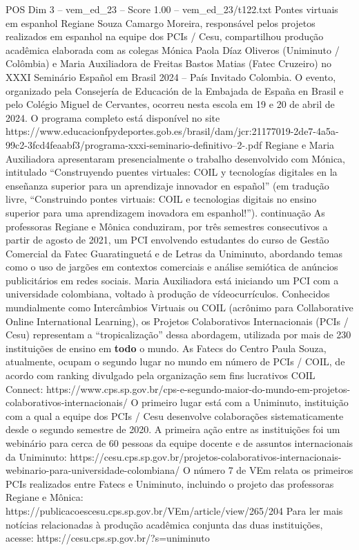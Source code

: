 \begin{textsample}{POS Dim 3 – vem\_ed\_23 – Score 1.00 – vem\_ed\_23/t122.txt}  \label{ex:f3_pos_038}
Pontes virtuais em espanhol Regiane Souza Camargo Moreira, responsável pelos projetos realizados em espanhol na equipe dos PCIs / Cesu, compartilhou produção acadêmica elaborada com as colegas Mónica Paola Díaz Oliveros (Uniminuto / Colômbia) e Maria Auxiliadora de Freitas Bastos Matias (Fatec Cruzeiro) no XXXI Seminário Español em Brasil 2024 – País Invitado Colombia.
O evento, organizado pela Consejería de Educación de la Embajada de España en Brasil e pelo Colégio Miguel de Cervantes, ocorreu nesta escola em 19 e 20 de abril de 2024.
O programa completo está disponível no site https://www.educacionfpydeportes.gob.es/brasil/dam/jcr:21177019-2de7-4a5a-99c2-3fcd4feaabf3/programa-xxxi-seminario-definitivo--2-.pdf Regiane e Maria Auxiliadora apresentaram presencialmente o trabalho desenvolvido com Mónica, intitulado “Construyendo puentes virtuales: COIL y tecnologías digitales en la enseñanza superior para un aprendizaje innovador en español” (em tradução livre, “Construindo pontes virtuais: COIL e tecnologias digitais no ensino superior para uma aprendizagem inovadora em espanhol!”). continuação As professoras Regiane e Mônica conduziram, por três semestres consecutivos a partir de agosto de 2021, um PCI envolvendo estudantes do curso de Gestão Comercial da Fatec Guaratinguetá e de Letras da Uniminuto, abordando temas como o uso de jargões em contextos comerciais e análise semiótica de anúncios publicitários em redes sociais.
Maria Auxiliadora está iniciando um PCI com a universidade colombiana, voltado à produção de vídeocurrículos.
Conhecidos mundialmente como Intercâmbios Virtuais ou COIL (acrônimo para Collaborative Online International Learning), os Projetos Colaborativos Internacionais (PCIs / Cesu) representam a “tropicalização” dessa abordagem, utilizada por mais de 230 instituições de ensino em \textbf{todo} o mundo.
As Fatecs do Centro Paula Souza, atualmente, ocupam o segundo lugar no mundo em número de PCIs / COIL, de acordo com ranking divulgado pela organização sem fins lucrativos COIL Connect: https://www.cps.sp.gov.br/cps-e-segundo-maior-do-mundo-em-projetos-colaborativos-internacionais/ O primeiro lugar está com a Uniminuto, instituição com a qual a equipe dos PCIs / Cesu desenvolve colaborações sistematicamente desde o segundo semestre de 2020.
A primeira ação entre as instituições foi um webinário para cerca de 60 pessoas da equipe docente e de assuntos internacionais da Uniminuto: https://cesu.cps.sp.gov.br/projetos-colaborativos-internacionais-webinario-para-universidade-colombiana/ O número 7 de VEm relata os primeiros PCIs realizados entre Fatecs e Uniminuto, incluindo o projeto das professoras Regiane e Mônica: https://publicacoescesu.cps.sp.gov.br/VEm/article/view/265/204 Para ler mais notícias relacionadas à produção acadêmica conjunta das duas instituições, acesse: https://cesu.cps.sp.gov.br/?s=uniminuto

\end{textsample}
